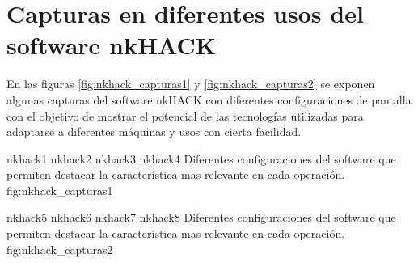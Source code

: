 
\chapter{Capturas en diferentes usos del software nkHACK}
\label{AppendixB}

En las figuras \ref{fig:nkhack_capturas1} y \ref{fig:nkhack_capturas2} se exponen algunas capturas del software nkHACK con diferentes configuraciones de pantalla con el objetivo de mostrar el potencial de las tecnologías utilizadas para adaptarse a diferentes máquinas y usos con cierta facilidad.

\subfiggridfour
   {nkhack1}
   {nkhack2}
   {nkhack3}
   {nkhack4}
   {Diferentes configuraciones del software que permiten destacar la característica mas relevante en cada operación.}
   {fig:nkhack_capturas1}

\subfiggridfour
   {nkhack5}
   {nkhack6}
   {nkhack7}
   {nkhack8}
   {Diferentes configuraciones del software que permiten destacar la característica mas relevante en cada operación.}
   {fig:nkhack_capturas2}

